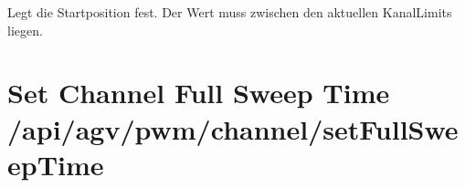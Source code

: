 \documentclass[letterpaper,10pt,english]{sphinxmanual}
\begin{document}
\sphinxAtStartPar
{}
Legt die Startposition fest. Der Wert muss zwischen den aktuellen Kanal\sphinxhyphen{}Limits liegen.

\sphinxAtStartPar
{}

\begin{sphinxVerbatim}[commandchars=\\\{\}]
\end{sphinxVerbatim}

\sphinxAtStartPar
{}

\begin{sphinxVerbatim}[commandchars=\\\{\}]
\end{sphinxVerbatim}


\section{Set Channel Full Sweep Time \textendash{} /api/agv/pwm/channel/setFullSweepTime}
\label{\detokenize{agv_rest_api_pwm:set-channel-full-sweep-time-api-agv-pwm-channel-setfullsweeptime}}\label{\detokenize{agv_rest_api_pwm:post-api-agv-pwm-channel-setfullsweeptime}}
\end{document}
